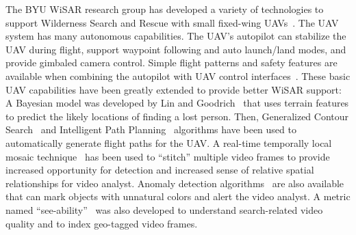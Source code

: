 The BYU WiSAR research group has developed a variety of technologies to support Wilderness Search and Rescue with small fixed-wing UAVs~\cite{Beard2005Autonomous, Goodrich2008Supporting, Goodrich2009Towards, Lin2010Supporting}. The UAV system has many autonomous capabilities. The UAV's autopilot can stabilize the UAV during flight, support waypoint following and auto launch/land modes, and provide gimbaled camera control. Simple flight patterns and safety features are available when combining the autopilot with UAV control interfaces~\cite{Beard2005Autonomous, Lin2010Supporting}. These basic UAV capabilities have been greatly extended to provide better WiSAR support: A Bayesian model was developed by Lin and Goodrich~\cite{Lin2010Bayesian} that uses terrain features to predict the likely locations of finding a lost person. Then, Generalized Contour Search~\cite{Goodrich2008Supporting} and Intelligent Path Planning~\cite{Lin2009UAV,Niedfeldt2010integrated} algorithms have been used to automatically generate flight paths for the UAV. A real-time temporally local mosaic technique~\cite{Morse2008Application} has been used to ``stitch'' multiple video frames to provide increased opportunity for detection and increased sense of relative spatial relationships for video analyst. Anomaly detection algorithms~\cite{Thornton2011Unusual} are also available that can mark objects with unnatural colors and alert the video analyst. A metric named ``see-ability''~\cite{Morse2010UAV} was also developed to understand search-related video quality and to index geo-tagged video frames. 

